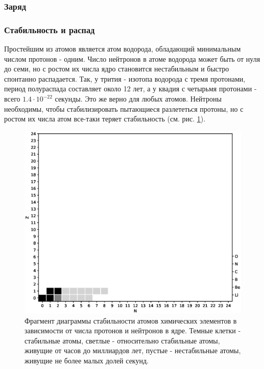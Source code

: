 \subsubsection*{Заряд}

\subsubsection*{Стабильность и распад}

Простейшим из атомов является атом водорода, обладающий минимальным числом протонов - одним.
Число нейтронов в атоме водорода может быть от нуля до семи, но с ростом их числа ядро становится нестабильным и быстро спонтанно распадается.
Так, у трития - изотопа водорода с тремя протонами, период полураспада составляет около 12 лет, а у квадия с четырьмя протонами - всего $1.4\cdot 10^{−22}$ секунды.
Это же верно для любых атомов.
Нейтроны необходимы, чтобы стабилизировать пытающиеся разлететься протоны, но с ростом их числа атом все-таки теряет стабильность (см. рис. \ref{fig:atom_stability}).


\begin{figure}[t!]
   \centering
   \includegraphics[scale=0.4]{images/atom_stability}
   \caption{Фрагмент диаграммы стабильности атомов химических элементов в зависимости от числа протонов и нейтронов в ядре. Темные клетки - стабильные атомы, светлые - относительно стабильные атомы, живущие от часов до миллиардов лет, пустые - нестабильные атомы, живущие не более малых долей секунд.}
   \label{fig:atom_stability}
\end{figure}




